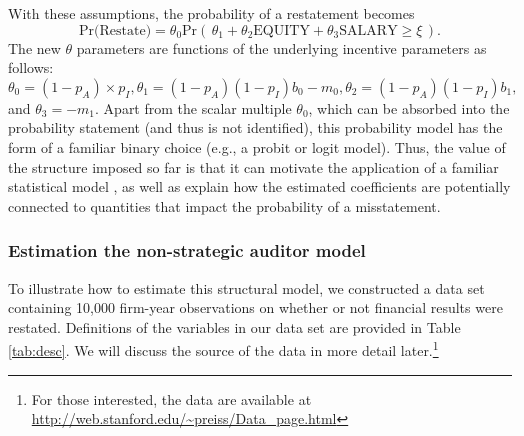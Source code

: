 With these assumptions, the probability of a restatement becomes
\begin{equation} \label{restate1}
\mbox{Pr(Restate)} = \theta_0 \mbox{Pr}\left(\, \theta_1 + \theta_2 \mbox{EQUITY} + \theta_3 \mbox{SALARY}  \ge \xi \,\right) .
\end{equation}
The new $\theta$ parameters are functions of the underlying incentive parameters as
follows: $\theta_0=(1-p_A) \times p_I, \theta_1 = (1 - p_A)(1 - p_I) b_0 - m_0, 
\theta_2 = (1 - p_A)(1 - p_I) b_1,$ and $\theta_3 = - m_1$. 
Apart from the scalar multiple $\theta_0$, which can be absorbed into the probability statement (and thus is not identified), this probability model has the form of  a familiar binary choice (e.g., a probit or logit model).
Thus, the value of the structure imposed so far is that it can motivate the application of a familiar statistical model \citep[as in][]{Efendi:2007ja}, as well as explain how the estimated coefficients are potentially connected to quantities that impact the probability of a misstatement.


\subsubsection{Estimation the non-strategic auditor model}

To illustrate how to estimate this structural model, we constructed a data set containing 10,000 firm-year observations on whether or not financial results were restated.
Definitions of the variables in our data set are provided in Table \ref{tab:desc}.
We will discuss the source of the data in more detail later.\footnote{For those interested, the data are available at \url{http://web.stanford.edu/~preiss/Data_page.html}}

